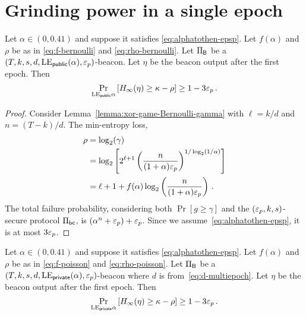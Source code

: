 
\section{Grinding power in a single epoch}

\begin{theorem}\label{thm:beacon-bernoulli-single-epoch}
  Let $\alpha \in (0, 0.41)$ and suppose it satisfies \eqref{eq:alphatothen-epsp}.
  Let $f(\alpha)$ and $\rho$ be as in \eqref{eq:f-bernoulli} and \eqref{eq:rho-bernoulli}.
  Let $\Pi_{\mathsf{B}}$ be a $(T,k,s,d,\mathrm{LE}_\mathsf{public}(\alpha), \mathsf{\varepsilon}_p)$-beacon.
  Let $\eta$ be the beacon output after the first epoch. 
  Then 
  \begin{equation}\label{eq:security-bernoulli-single-epoch}
    \Pr_{\mathrm{LE}_\mathsf{public}{\alpha}}\left[H_\infty(\eta) \geq \kappa - \rho \right] \geq 1 - 3 \mathsf{\varepsilon}_p
    \,.
  \end{equation}
\end{theorem}
\begin{proof}  
  Consider Lemma~\ref{lemma:xor-game-Bernoulli-gamma} 
  with $\ell = k/d$ and $n = (T-k)/d$. 
  The min-entropy loss, 
  \begin{align*}
    \rho &= \log_2(\gamma) \\
        &= \log_2 \left[  2^{\ell + 1} \left(
                \frac{n}{(1+\alpha)\mathsf{\varepsilon}_p}
            \right)^{1/\log_2(1/\alpha)}\right] \\
        &= \ell + 1 + f(\alpha) \log_2\left(\frac{n}{(1+\alpha)\mathsf{\varepsilon}_p}\right)
        \,.
  \end{align*}
  The total failure probability, 
  considering both $\Pr[g \geq \gamma]$ and 
  the $(\mathsf{\varepsilon}_p, k, s)$-secure protocol $\Pi_\mathsf{bc}$, 
  is $(\alpha^n + \mathsf{\varepsilon}_p) + \mathsf{\varepsilon}_p$. 
  Since we assume~\eqref{eq:alphatothen-epsp}, it is at most $3 \mathsf{\varepsilon}_p$.
\end{proof}

\begin{theorem}\label{thm:beacon-poisson-single-epoch}
  Let $\alpha \in (0, 0.41)$ and suppose it satisfies \eqref{eq:alphatothen-epsp}.
  Let $f(\alpha)$ and $\rho$ be as in \eqref{eq:f-poisson} and \eqref{eq:rho-poisson}.
  Let $\Pi_{\mathsf{B}}$ be a $(T,k,s,d,\mathrm{LE}_\mathsf{private}(\alpha), \mathsf{\varepsilon}_p)$-beacon 
  where $d$ is from~\eqref{eq:d-multiepoch}.
  Let $\eta$ be the beacon output after the first epoch. 
  Then 
  \begin{equation}\label{eq:security-bernoulli-single-epoch}
    \Pr_{\mathrm{LE}_\mathsf{private}{\alpha}}\left[H_\infty(\eta) \geq \kappa - \rho \right] \geq 1 - 3 \mathsf{\varepsilon}_p
    \,.
  \end{equation}
\end{theorem}


